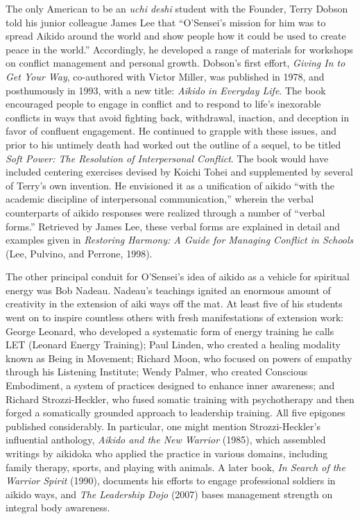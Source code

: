 The only American to be an \emph{uchi deshi} student with the Founder, Terry Dobson told his junior colleague James Lee that ``O'Sensei's mission for him was to spread Aikido around the world and show people how it could be used to create peace in the world.'' Accordingly, he developed a range of materials for workshops on conflict management and personal growth. Dobson's first effort, \emph{Giving In to Get Your Way}, co-authored with Victor Miller, was published in 1978, and posthumously in 1993, with a new title: \emph{Aikido in Everyday Life}. The book encouraged people to engage in conflict and to respond to life's inexorable conflicts in ways that avoid fighting back, withdrawal, inaction, and deception in favor of confluent engagement. He continued to grapple with these issues, and prior to his untimely death had worked out the outline of a sequel, to be titled \emph{Soft Power: The Resolution of Interpersonal Conflict}. The book would have included centering exercises devised by Koichi Tohei and supplemented by several of Terry's own invention. He envisioned it as a unification of aikido ``with the academic discipline of interpersonal communication,'' wherein the verbal counterparts of aikido responses were realized through a number of ``verbal forms.'' Retrieved by James Lee, these verbal forms are explained in detail and examples given in \emph{Restoring Harmony: A Guide for Managing Conflict in Schools} (Lee, Pulvino, and Perrone, 1998). 

The other principal conduit for O'Sensei's idea of aikido as a vehicle for spiritual energy was Bob Nadeau. Nadeau's teachings ignited an enormous amount of creativity in the extension of aiki ways off the mat. At least five of his students went on to inspire countless others with fresh manifestations of extension work: George Leonard, who developed a systematic form of energy training he calls LET (Leonard Energy Training); Paul Linden, who created a healing modality known as Being in Movement\textregistered; Richard Moon, who focused on powers of empathy through his Listening Institute; Wendy Palmer, who created Conscious Embodiment, a system of practices designed to enhance inner awareness; and Richard Strozzi-Heckler, who fused somatic training with psychotherapy and then forged a somatically grounded approach to leadership training. All five epigones published considerably. In particular, one might mention Strozzi-Heckler's influential anthology, \emph{Aikido and the New Warrior} (1985), which assembled writings by aikidoka who applied the practice in various domains, including family therapy, sports, and playing with animals. A later book, \emph{In Search of the Warrior Spirit} (1990), documents his efforts to engage professional soldiers in aikido ways, and \emph{The Leadership Dojo} (2007) bases management strength on integral body awareness. 

